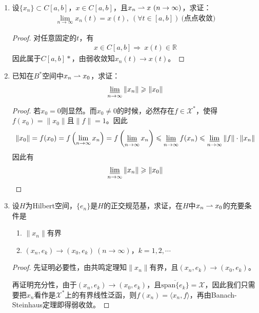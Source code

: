 \begin{enumerate}[leftmargin=2cm, label=\arabic*]
		\item 设$\{x_n\}\subset C[a,b]$，$x\in C[a,b]$，且$x_n\rightharpoonup x\ (n\to\infty)$，求证：
		\begin{align*}
			\lim\limits_{n\to\infty} x_n(t) = x(t),\ (\forall t\in[a,b]) \ \text{(点点收敛)}
		\end{align*}
		\begin{proof}
			对任意固定的$t$，有
			\begin{align*}
				x\in C[a,b] \Rightarrow \ x(t)\in\mathbb{R}
			\end{align*}
			因此属于$C[a,b]*$，由弱收敛知$x_n(t)\to x(t)$。
		\end{proof}
		
		\item 已知在$B^*$空间中$x_n\rightharpoonup x_0$，求证：
		\begin{align*}
			\varliminf\limits_{n\to\infty} \|x_n\| \geqslant \|x_0\|
		\end{align*}
		\begin{proof}
			若$x_0 = 0$则显然。而$x_0\neq 0$的时候，必然存在$f\in\mathscr{X}^*$，使得$f(x_0) = \|x_0\|$且$\|f\| = 1$。因此
			\begin{align*}
				\|x_0\| = f(x_0) = f\left(\lim\limits_{n\to\infty} x_n\right) = f\left(\varliminf\limits_{n\to\infty} x_n\right) \leqslant \varliminf\limits_{n\to\infty} f(x_n) \leqslant \varliminf\limits_{n\to\infty} \|f\| \cdot\|x_n\| 
			\end{align*}
			因此有
			\begin{align*}
				\varliminf\limits_{n\to\infty} \|x_n\| \geqslant \|x_0\|
			\end{align*}
		\end{proof}
		
		\item 设$H$为Hilbert空间，$\{e_n\}$是$H$的正交规范基，求证，在$H$中$x_n\rightharpoonup x_0$的充要条件是
		\begin{enumerate}[leftmargin=1cm, label=(\arabic*)]
			\item $\|x_n\|$有界
			\item $(x_n,e_k)\to (x_0,e_k)\ (n\to\infty)$，$k=1,2,\cdots$
		\end{enumerate}
		\begin{proof}
			先证明必要性，由共鸣定理知$\|x_n\|$有界，且$(x_n,e_k)\to (x_0,e_k)$。
			
			再证明充分性，由于$(x_n,e_k)\to (x_0,e_k)$，且$\overline{\text{span}\{e_k\}} = \mathscr{X}$，因此我们只需要把$x_n$看作是$\mathscr{X}^*$上的有界线性泛函，则$f(x_n) = \langle x_n,f \rangle$，再由Banach-Steinhaus定理即得弱收敛。
		\end{proof}
		

\end{enumerate}
